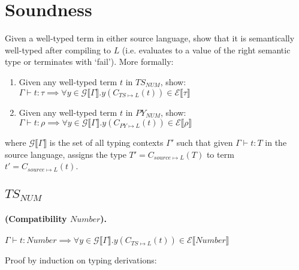 \documentclass{article}
\newcommand{\denoteset}[2]{\mathcal{#1} \llbracket #2 \rrbracket}
\begin{document}
	\section{Soundness}

	Given a well-typed term in either source language, show that it is semantically well-typed after compiling to $L$ (i.e. evaluates to a value of the right semantic type or terminates with `fail'). More formally:
	
	\begin{enumerate}
		\item Given any well-typed term $t$ in $TS_{NUM}$, show:\\
		$\Gamma \vdash t: \tau \implies \forall y \in \denoteset{G}{\Gamma}. y(C_{TS \mapsto L}(t)) \in \denoteset{E}{\tau}$
		\item Given any well-typed term $t$ in $PY_{NUM}$, show:\\
		$\Gamma \vdash t: \rho \implies \forall y \in \denoteset{G}{\Gamma}. y(C_{PY \mapsto L}(t)) \in \denoteset{E}{\rho}$
	\end{enumerate}


	where $\denoteset{G}{\Gamma}$ is the set of all typing contexts $\Gamma'$ such that given $\Gamma \vdash t: T$ in the source language, assigns the type $T' = C_{source \mapsto L}(T)$ to term $t' = C_{source \mapsto L}(t)$.
	
	\subsection{$TS_{NUM}$}
	
	\paragraph{(Compatibility $Number$).}
	$\Gamma \vdash t: Number \implies \forall y \in \denoteset{G}{\Gamma}. y(C_{TS \mapsto L}(t)) \in \denoteset{E}{Number}$
	
	Proof by induction on typing derivations:
	
\end{document}
